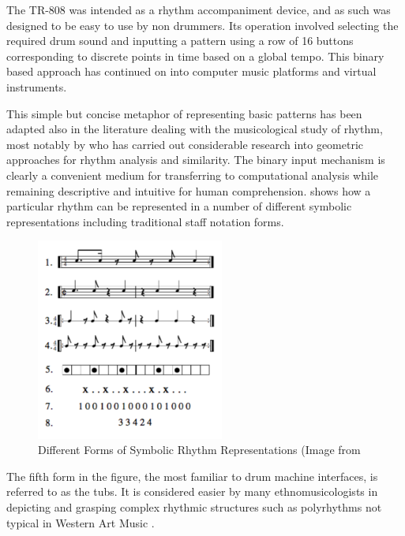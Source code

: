 The TR-808 was intended as a rhythm accompaniment device, and as such was designed to be easy to use by non drummers. Its operation involved selecting the required drum sound and inputting a pattern using a row of 16 buttons corresponding to discrete points in time based on a global tempo. This binary based approach has continued on into computer music platforms and virtual instruments. 


This simple but concise metaphor of representing basic patterns has been adapted also in the literature dealing with the musicological study of rhythm, most notably by \cite{Toussaint2013} who has carried out considerable research into geometric approaches for rhythm analysis and similarity. The binary input mechanism is clearly a convenient medium for transferring to computational analysis while remaining descriptive and intuitive for human comprehension.   shows how a particular rhythm can be represented in a number of different symbolic representations including traditional staff notation forms.

\begin{figure}
	\begin{center}
		\includegraphics[width=0.55\textwidth]{ch03_symbolic/figures/reps.png}
	\end{center}
	\caption[Different Forms of Symbolic Rhythm Representations]{Different Forms of Symbolic Rhythm Representations (Image from \citep{Toussaint2003}}
	\label{fig:reps}
\end{figure}

The fifth form in the figure, the most familiar to drum machine interfaces, is referred to as the \acrfull{tubs}. It is considered easier by many ethnomusicologists in depicting and grasping complex rhythmic structures such as polyrhythms not typical in Western Art Music \citep{nzewi2008musical, koetting1970analysis}.  

